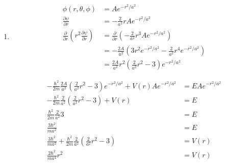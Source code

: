 \documentclass{article}
\begin{document}
\begin{enumerate}
  \item

        \begin{align*}
          \phi(r, \theta, \phi)                                                           & = A e^{-r^2 / a^2}                                                                        \\
          \frac{\partial \psi}{\partial r}                                                & = -\frac{2}{a^2} r A e^{-r^2 / a^2}                                                       \\
          \frac{\partial}{\partial r} \left( r^2 \frac{\partial \psi}{\partial r} \right) & = \frac{\partial}{\partial r} \left( -\frac{2}{a^2} r^3 A e^{-r^2 / a^2} \right)          \\
                                                                                          & = -\frac{2 A}{a^2} \left( 3 r^2 e^{-r^2 / a^2} - \frac{2}{a^2} r^4 e^{-r^2 / a^2} \right) \\
                                                                                          & = \frac{2 A}{a^2} r^2 \left( \frac{2}{a^2} r^2 - 3 \right) e^{-r^2 / a^2}
        \end{align*}

        \begin{align*}
          -\frac{\hbar^2}{2 m} \frac{2 A}{a^2} \left( \frac{2}{a^2} r^2 - 3 \right) e^{-r^2 / a^2} + V(r) A e^{-r^2 / a^2} & = E A e^{-r^2 / a^2} \\
          -\frac{\hbar^2}{2 m} \frac{2}{a^2} \left( \frac{2}{a^2} r^2 - 3 \right) + V(r)                                   & = E                  \\
          \frac{\hbar^2}{2 m} \frac{2}{a^2} 3                                                                              & = E                  \\
          \frac{3 \hbar^2}{m a^2}                                                                                          & = E                  \\
          \frac{3 \hbar^2}{m a^2} + \frac{\hbar^2}{2 m} \frac{2}{a^2} \left( \frac{2}{a^2} r^2 - 3 \right)                 & = V(r)               \\
          \frac{2 \hbar^2}{m a^4} r^2                                                                                      & = V(r)               \\
        \end{align*}
\end{enumerate}
\end{document}

